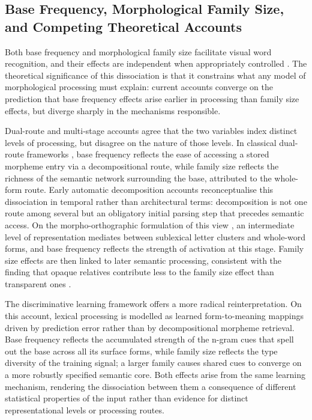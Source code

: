 \subsection{Base Frequency, Morphological Family Size, and Competing Theoretical Accounts}

Both base frequency and morphological family size facilitate visual word recognition, and their effects are independent when appropriately controlled \citep{fordDerivationalMorphologyBase2010}. The theoretical significance of this dissociation is that it constrains what any model of morphological processing must explain: current accounts converge on the prediction that base frequency effects arise earlier in processing than family size effects, but diverge sharply in the mechanisms responsible.

Dual-route and multi-stage accounts agree that the two variables index distinct levels of processing, but disagree on the nature of those levels. In classical dual-route frameworks \citep{schreuderModelingMorphologicalProcessing1995, dejongMorphologicalFamilySize2000}, base frequency reflects the ease of accessing a stored morpheme entry via a decompositional route, while family size reflects the richness of the semantic network surrounding the base, attributed to the whole-form route. Early automatic decomposition accounts \citep{taft_lexical_1975, taftMorphologicalDecompositionReverse2004} reconceptualise this dissociation in temporal rather than architectural terms: decomposition is not one route among several but an obligatory initial parsing step that precedes semantic access. On the morpho-orthographic formulation of this view \citep{rastleMorphologicalDecompositionBased2008, longtinMorphologicalDecompositionEarly2005, morrisSemanticTransparencyMasked2007}, an intermediate level of representation mediates between sublexical letter clusters and whole-word forms, and base frequency reflects the strength of activation at this stage. Family size effects are then linked to later semantic processing, consistent with the finding that opaque relatives contribute less to the family size effect than transparent ones \citep{schreuderHowComplexSimplex1997, dejongMorphologicalFamilySize2000}. 

The discriminative learning framework \citep[NDL/LDL;][]{chuangDiscriminativeLearningLexicon} offers a more radical reinterpretation. On this account, lexical processing is modelled as learned form-to-meaning mappings driven by prediction error rather than by decompositional morpheme retrieval. Base frequency reflects the accumulated strength of the n-gram cues that spell out the base across all its surface forms, while family size reflects the type diversity of the training signal; a larger family causes shared cues to converge on a more robustly specified semantic core. Both effects arise from the same learning mechanism, rendering the dissociation between them a consequence of different statistical properties of the input rather than evidence for distinct representational levels or processing routes.

